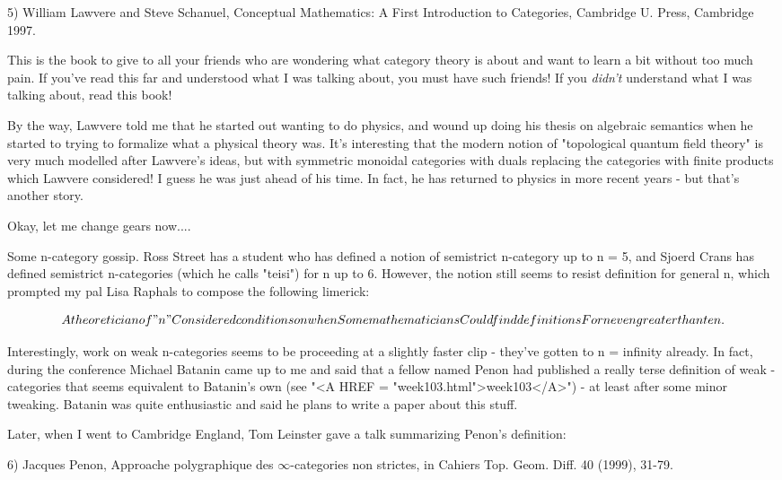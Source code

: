 5) William Lawvere and Steve Schanuel, Conceptual Mathematics:
A First Introduction to Categories, Cambridge U. Press, Cambridge 1997.

This is the book to give to all your friends who are wondering
what category theory is about and want to learn a bit without
too much pain.  If you've read this far and understood what I 
was talking about, you must have such friends!  If you \emph{didn't}
understand what I was talking about, read this book!

By the way, Lawvere told me that he started out wanting to do
physics, and wound up doing his thesis on algebraic semantics 
when he started to trying to formalize what a physical theory
was.   It's interesting that the modern notion of "topological
quantum field theory" is very much modelled after Lawvere's ideas,
but with symmetric monoidal categories with duals replacing the
categories with finite products which Lawvere considered!  I guess
he was just ahead of his time.  In fact, he has returned to physics
in more recent years - but that's another story.

Okay, let me change gears now....

Some n-category gossip.  Ross Street has a student who has defined a
notion of semistrict n-category up to n = 5, and Sjoerd Crans has
defined semistrict n-categories (which he calls "teisi") for n up to
6.  However, the notion still seems to resist definition for general
n, which prompted my pal Lisa Raphals to compose the following
limerick:

$$

     A theoretician of "n"
     Considered conditions on when
     Some mathematicians
     Could find definitions 
     For n even greater than ten.
$$
    
Interestingly, work on weak n-categories seems to be proceeding at
a slightly faster clip - they've gotten to n = infinity already.  
In fact, during the conference Michael Batanin came up to me and said
that a fellow named Penon had published a really terse definition of 
weak \omega -categories that seems equivalent to Batanin's own 
(see "<A HREF = "week103.html">week103</A>") - at least after some minor tweaking.  Batanin was quite 
enthusiastic and said he plans to write a paper about this stuff.  

Later, when I went to Cambridge England, Tom Leinster gave a talk
summarizing Penon's definition:

6) Jacques Penon, Approache polygraphique des $\infty$-categories
non strictes, in Cahiers Top. Geom. Diff. 40 (1999), 31-79.

